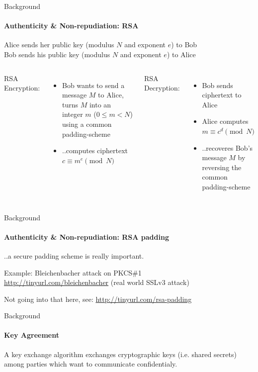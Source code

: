\documentclass[hyperref={draft}]{beamer}
\begin{document}
\begin{frame}{Background}
  \framesubtitle{Authenticity \& Non-repudiation: RSA}
  Alice sends her public key (modulus $N$ and exponent $e$) to Bob\\
  Bob sends his public key (modulus $N$ and exponent $e$) to Alice
  \vspace{10px}
  \begin{columns}[T]
    RSA Encryption:
    \begin{itemize}
      \item Bob wants to send a message $M$ to Alice, turns $M$ into an integer $m$ ($0 \leq m < N$) using a common padding-scheme
      \item ..computes ciphertext\\ $c \equiv m^e \pmod N$
    \end{itemize}
    RSA Decryption:
    \begin{itemize}
      \item Bob sends ciphertext to Alice
      \item Alice computes\\$m \equiv c^d \pmod N$
      \item ..recoveres Bob's message $M$ by reversing the common padding-scheme
    \end{itemize}
  \end{columns}
\end{frame}

\begin{frame}{Background}
  \framesubtitle{Authenticity \& Non-repudiation: RSA padding}
  ..a secure padding scheme is really important.

  \vspace{20px}
 
  Example: Bleichenbacher attack on PKCS\#1\\
  \url{http://tinyurl.com/bleichenbacher} (real world SSLv3 attack)
  
  \vspace{20px}

  Not going into that here, see: \url{http://tinyurl.com/rsa-padding}
\end{frame}

\begin{frame}{Background}
  \framesubtitle{Key Agreement}
  A key exchange algorithm exchanges cryptographic keys (i.e. shared secrets) among parties which want to communicate confidentialy.
\end{frame}
\end{document}
